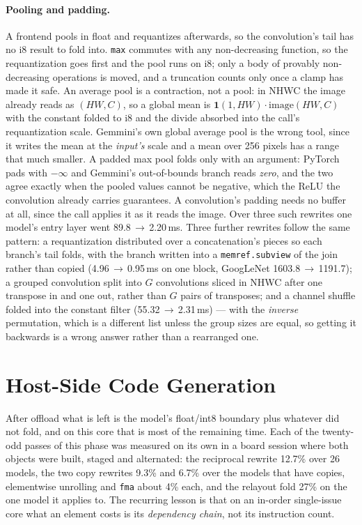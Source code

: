 \documentclass[runningheads]{llncs}
\begin{document}
\paragraph{Pooling and padding.} A frontend pools in float and requantizes afterwards, so the convolution's tail
has no i8 result to fold into. \texttt{max} commutes with any non-decreasing
function, so the requantization goes first and the pool runs on i8; only a body of
provably non-decreasing operations is moved, and a truncation counts only once a
clamp has made it safe. An average pool is a contraction, not a pool: in NHWC the
image already reads as $(HW,C)$, so a global mean is
$\mathbf{1}(1,HW)\cdot\mathrm{image}(HW,C)$ with the constant folded to i8 and the
divide absorbed into the call's requantization scale. Gemmini's own global average pool is the wrong tool, since it writes the mean at
the \emph{input's} scale and a mean over 256 pixels has a range that much
smaller. A padded max pool folds only with an argument: PyTorch pads with
$-\infty$ and Gemmini's out-of-bounds branch reads \emph{zero}, and the two agree
exactly when the pooled values cannot be negative, which the ReLU the convolution
already carries guarantees. A convolution's
padding needs no buffer at all, since the call applies it as it reads the image.
Over three such rewrites one model's entry layer went 89.8\,$\to$\,2.20\,ms.
Three further rewrites follow the same pattern: a requantization distributed over
a concatenation's pieces so each branch's tail folds, with the branch written into
a \texttt{memref.subview} of the join rather than copied (4.96\,$\to$\,0.95\,ms
on one block, GoogLeNet 1603.8\,$\to$\,1191.7); a grouped convolution split into
$G$ convolutions sliced in NHWC after one transpose in and one out, rather than
$G$ pairs of transposes; and a channel shuffle folded into the constant filter
(55.32\,$\to$\,2.31\,ms) --- with the \emph{inverse} permutation, which is a
different list unless the group sizes are equal, so getting it backwards is a
wrong answer rather than a rearranged one.

\section{Host-Side Code Generation}
\label{sec:host}

After offload what is left is the model's float/int8 boundary plus whatever did not
fold, and on this core that is most of the remaining time.
Each of the twenty-odd passes of this phase was measured on its own in a board
session where both objects were built, staged and alternated: the reciprocal
rewrite 12.7\% over 26 models, the two copy rewrites 9.3\% and 6.7\% over the
models that have copies, elementwise unrolling and \texttt{fma} about 4\% each,
and the relayout fold 27\% on the one model it applies to. The recurring lesson is
that on an in-order single-issue core what an element costs is its
\emph{dependency chain}, not its instruction count.
\end{document}

